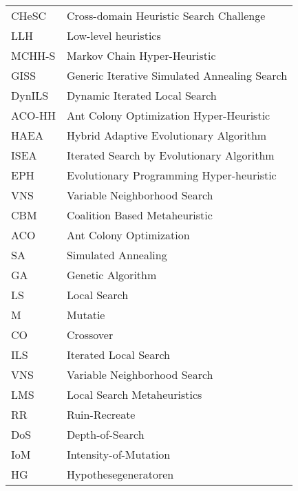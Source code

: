 \begin{flushleft}
  \renewcommand{\arraystretch}{1.1}
  \begin{tabularx}{\textwidth}{@{}p{22mm}X@{}}%
    CHeSC	& Cross-domain Heuristic Search Challenge \\
    LLH		&Low-level heuristics \\
    MCHH-S	&Markov Chain Hyper-Heuristic\\
    GISS	&Generic Iterative Simulated Annealing Search\\
    DynILS	&Dynamic Iterated Local Search\\
    ACO-HH	&Ant Colony Optimization Hyper-Heuristic\\
    HAEA	&Hybrid Adaptive Evolutionary Algorithm\\
    ISEA	&Iterated Search by Evolutionary Algorithm\\
    EPH		&Evolutionary Programming Hyper-heuristic\\
    VNS		&Variable Neighborhood Search\\
    CBM		&Coalition Based Metaheuristic\\
    ACO		&Ant Colony Optimization\\
    SA		&Simulated Annealing\\
    GA		&Genetic Algorithm\\
    LS		&Local Search\\
    M		&Mutatie\\
    CO		&Crossover\\
    ILS		&Iterated Local Search\\
    VNS		&Variable Neighborhood Search\\
    LMS		&Local Search Metaheuristics\\
    RR		&Ruin-Recreate\\
    DoS		&Depth-of-Search\\
    IoM		&Intensity-of-Mutation\\
    HG		&Hypothesegeneratoren\\
  \end{tabularx}
\end{flushleft}
